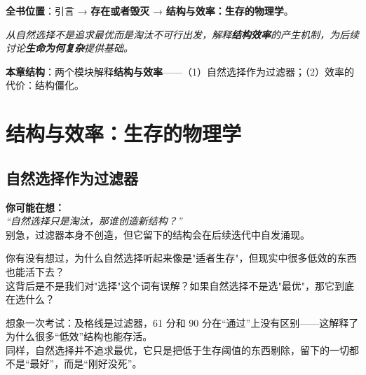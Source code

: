 \documentclass[../main.tex]{subfiles}
\begin{document}
	\textbf{\large 全书位置}：引言 → \textbf{存在或者毁灭} → \textbf{结构与效率：生存的物理学}。

	\textit{从自然选择不是追求最优而是淘汰不可行出发，解释\textbf{结构效率}的产生机制，为后续讨论\textbf{生命为何复杂}提供基础。}

	\vspace{1em}

	\textbf{\large 本章结构}：两个模块解释\textbf{结构与效率}——（1）自然选择作为过滤器；（2）效率的代价：结构僵化。

	\vspace{1em}


\chapter{结构与效率：生存的物理学}
\label{chap:structure_efficiency}


\label{sec:selection_filter}

\section{自然选择作为过滤器}

\begin{tcolorbox}[colback=yellow!5, title=\textit{读者行为预测}]
	\textbf{你可能在想：}\\
	\textit{“自然选择只是淘汰，那谁创造新结构？”}\\
	别急，过滤器本身不创造，但它留下的结构会在后续迭代中自发涌现。
\end{tcolorbox}

\begin{readingnote}
	你有没有想过，为什么自然选择听起来像是"适者生存"，但现实中很多低效的东西也能活下去？\\
	这背后是不是我们对"选择"这个词有误解？如果自然选择不是选"最优"，那它到底在选什么？
\end{readingnote}

\begin{tcolorbox}[colback=green!5, title=\textit{生活类比}]
	想象一次考试：及格线是过滤器，61 分和 90 分在“通过”上没有区别——这解释了为什么很多“低效”结构也能存活。\\
	同样，自然选择并不追求最优，它只是把低于生存阈值的东西剔除，留下的一切都不是“最好”，而是“刚好没死”。
\end{tcolorbox}
\end{document}
